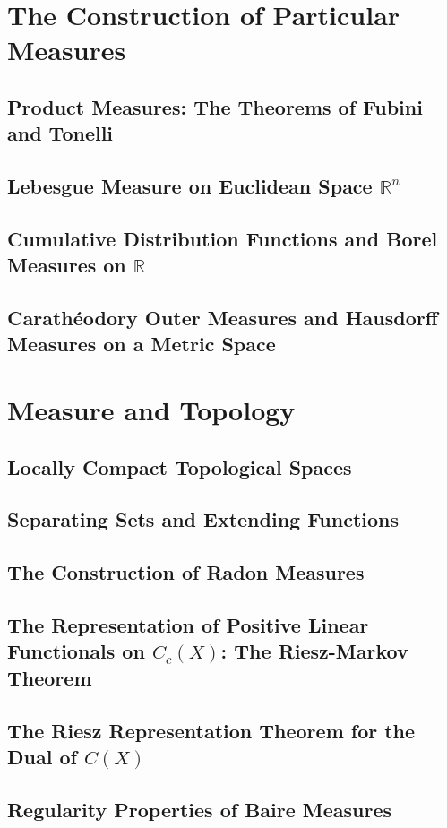\documentclass[a4paper,10pt]{book}
\theoremstyle{plain} %
\begin{document}
\chapter{The Construction of Particular Measures}

\section{Product Measures: The Theorems of Fubini and Tonelli}
\section{Lebesgue Measure on Euclidean Space $\mathbb{R}^n$}
\section{Cumulative Distribution Functions and Borel Measures on $\mathbb{R}$}
\section{Carath\'eodory Outer Measures and Hausdorff Measures on a Metric Space}

\chapter{Measure and Topology}

\section{Locally Compact Topological Spaces}
\section{Separating Sets and Extending Functions}
\section{The Construction of Radon Measures}
\section{The Representation of Positive Linear Functionals on $C_c(X)$: The Riesz-Markov Theorem}
\section{The Riesz Representation Theorem for the Dual of $C(X)$}
\section{Regularity Properties of Baire Measures}
\end{document}
